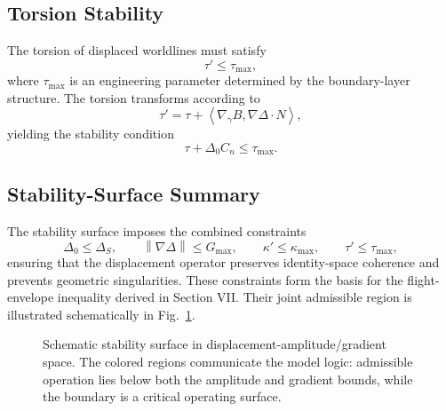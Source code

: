 \documentclass[aip,adv,reprint,floatfix]{revtex4-2}
\begin{document}
\subsection{Torsion Stability}

The torsion of displaced worldlines must satisfy
\begin{equation}
\tau' \leq \tau_{\max},
\end{equation}
where $\tau_{\max}$ is an engineering parameter determined by the boundary-layer structure. The torsion transforms according to
\begin{equation}
\tau' = \tau + \left\langle \nabla_{\dot{\gamma}} B, \nabla \Delta \cdot N \right\rangle,
\end{equation}
yielding the stability condition
\begin{equation}
\tau + \Delta_0 C_n \leq \tau_{\max}.
\end{equation}

\subsection{Stability-Surface Summary}

The stability surface imposes the combined constraints
\begin{equation}
\Delta_0 \leq \Delta_S,
\qquad
\left\| \nabla \Delta \right\| \leq G_{\max},
\qquad
\kappa' \leq \kappa_{\max},
\qquad
\tau' \leq \tau_{\max},
\end{equation}
ensuring that the displacement operator preserves identity-space coherence and prevents geometric singularities. These constraints form the basis for the flight-envelope inequality derived in Section VII. Their joint admissible region is illustrated schematically in Fig.~\ref{fig:stability_surface}.
\begin{figure}[tb]
\centering
{}
\caption{Schematic stability surface in displacement-amplitude/gradient space. The colored regions communicate the model logic: admissible operation lies below both the amplitude and gradient bounds, while the boundary is a critical operating surface.}
\label{fig:stability_surface}
\end{figure}
\end{document}
